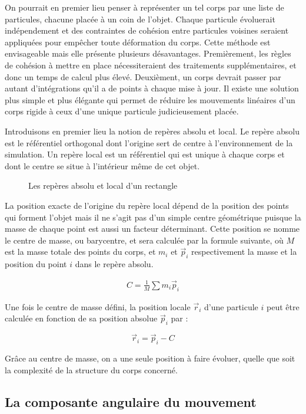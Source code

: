 On pourrait en premier lieu penser à représenter un tel corps par une
liste de particules, chacune placée à un coin de l'objet. Chaque
particule évoluerait indépendement et des contraintes de cohésion
entre particules voisines seraient appliquées pour empêcher toute
déformation du corps. Cette méthode est envisageable mais elle
présente plusieurs désavantages. Premièrement, les règles de cohésion
à mettre en place nécessiteraient des traitements supplémentaires, et
donc un temps de calcul plus élevé. Deuxièment, un corps devrait
passer par autant d'intégrations qu'il a de points à chaque mise à
jour. Il existe une solution plus simple et plus élégante qui permet
de réduire les mouvements linéaires d'un corps rigide à ceux d'une
unique particule judicieusement placée.

Introduisons en premier lieu la notion de repères absolu et local. Le
repère absolu est le référentiel orthogonal dont l'origine sert de
centre à l'environnement de la simulation. Un repère local est un
référentiel qui est unique à chaque corps et dont le centre se situe à
l'intérieur même de cet objet.

\begin{figure}
  \centering
  
  \label{reperelocal}
  \caption{Les repères absolu et local d'un rectangle}
\end{figure}

La position exacte de l'origine du repère local dépend de la position
des points qui forment l'objet mais il ne s'agit pas d'un simple
centre géométrique puisque la masse de chaque point est aussi un
facteur déterminant. Cette position se nomme le centre de masse, ou
barycentre, et sera calculée par la formule suivante, o\`u $M$ est la
masse totale des points du corps, et $m_i$ et $\vec{p}_i$
respectivement la masse et la position du point $i$ dans le repère
absolu.

\begin{align*}
  C = \frac{1}{M} \sum m_i \vec{p}_i
\end{align*}

Une fois le centre de masse défini, la position locale $\vec{r}_i$
d'une particule $i$ peut être calculée en fonction de sa position
absolue $\vec{p}_i$ par :

\[\vec{r}_i = \vec{p}_i - C\]

Grâce au centre de masse, on a une seule position à faire évoluer,
quelle que soit la complexité de la structure du corps concerné.

\subsection{La composante angulaire du mouvement}

